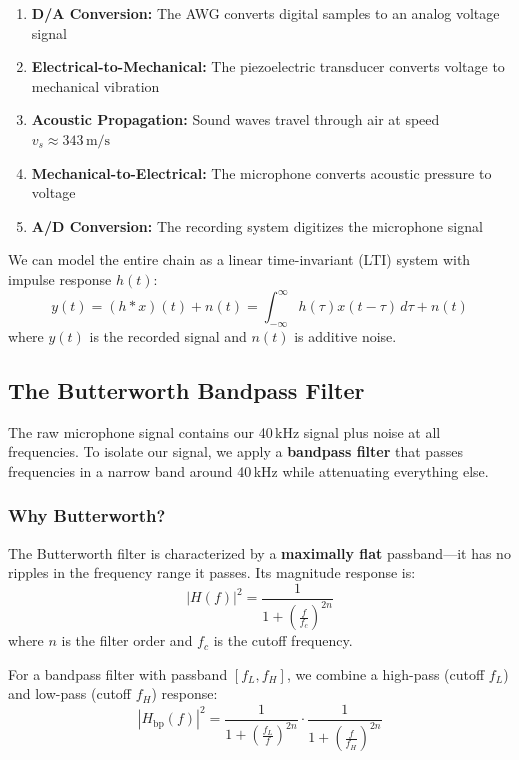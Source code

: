 \documentclass[11pt]{article}
\begin{document}
\begin{enumerate}
    \item \textbf{D/A Conversion:} The AWG converts digital samples to an analog voltage signal
    \item \textbf{Electrical-to-Mechanical:} The piezoelectric transducer converts voltage to mechanical vibration
    \item \textbf{Acoustic Propagation:} Sound waves travel through air at speed $v_s \approx 343\,\text{m/s}$
    \item \textbf{Mechanical-to-Electrical:} The microphone converts acoustic pressure to voltage
    \item \textbf{A/D Conversion:} The recording system digitizes the microphone signal
\end{enumerate}

We can model the entire chain as a linear time-invariant (LTI) system with impulse response $h(t)$:
\begin{equation}
    y(t) = (h * x)(t) + n(t) = \int_{-\infty}^{\infty} h(\tau) x(t - \tau) \, d\tau + n(t)
\end{equation}
where $y(t)$ is the recorded signal and $n(t)$ is additive noise.

\subsection{The Butterworth Bandpass Filter}

The raw microphone signal contains our 40\,kHz signal plus noise at all frequencies. To isolate our signal, we apply a \textbf{bandpass filter} that passes frequencies in a narrow band around 40\,kHz while attenuating everything else.

\subsubsection{Why Butterworth?}

The Butterworth filter is characterized by a \textbf{maximally flat} passband---it has no ripples in the frequency range it passes. Its magnitude response is:
\begin{equation}
    |H(f)|^2 = \frac{1}{1 + \left(\frac{f}{f_c}\right)^{2n}}
\end{equation}
where $n$ is the filter order and $f_c$ is the cutoff frequency.

For a bandpass filter with passband $[f_L, f_H]$, we combine a high-pass (cutoff $f_L$) and low-pass (cutoff $f_H$) response:
\begin{equation}
    |H_{\text{bp}}(f)|^2 = \frac{1}{1 + \left(\frac{f_L}{f}\right)^{2n}} \cdot \frac{1}{1 + \left(\frac{f}{f_H}\right)^{2n}}
\end{equation}
\end{document}
